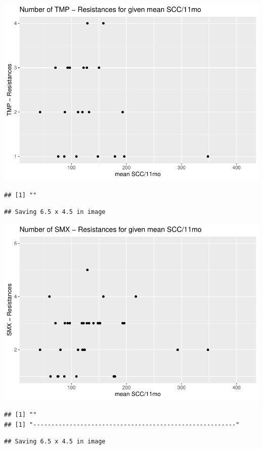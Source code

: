 \documentclass[
]{article}
\begin{document}
\includegraphics{NResistenzen_files/figure-latex/numerical_variables-19.pdf}

\begin{verbatim}
## [1] ""
\end{verbatim}

\begin{verbatim}
## Saving 6.5 x 4.5 in image
\end{verbatim}

\includegraphics{NResistenzen_files/figure-latex/numerical_variables-20.pdf}

\begin{verbatim}
## [1] ""
## [1] "--------------------------------------------------------"
\end{verbatim}

\begin{verbatim}
## Saving 6.5 x 4.5 in image
\end{verbatim}
\end{document}
